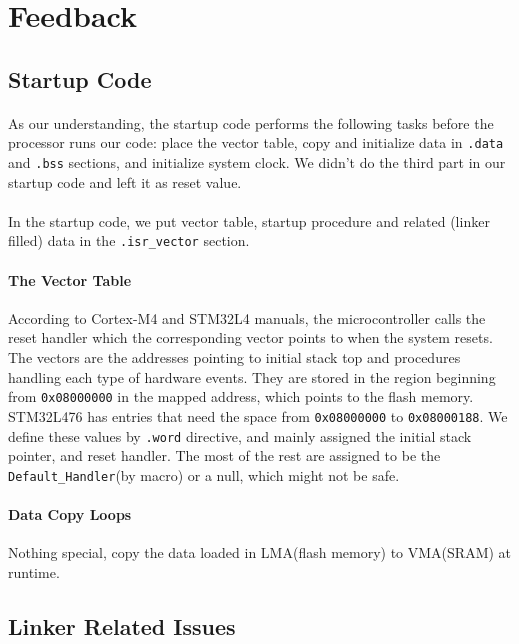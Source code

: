 \section{Feedback}
\subsection{Startup Code}
\paragraph{}
As our understanding, the startup code performs the following tasks before the processor runs our code: 
place the vector table, copy and initialize data in \texttt{.data} and \texttt{.bss} sections, and initialize system clock. 
We didn't do the third part in our startup code and left it as reset value.
\paragraph{}
In the startup code, we put vector table, startup procedure and related (linker filled) data in the \texttt{.isr\_vector} section.
\paragraph{The Vector Table}
According to Cortex-M4 and STM32L4 manuals, the microcontroller calls the reset handler which the corresponding vector points to when the system resets.
The vectors are the addresses pointing to initial stack top and procedures handling each type of hardware events.
They are stored in the region beginning from \texttt{0x08000000} in the mapped address,
which points to the flash memory.
STM32L476 has entries that need the space from \texttt{0x08000000} to \texttt{0x08000188}.
We define these values by \texttt{.word} directive, and mainly assigned the initial stack pointer, and reset handler.
The most of the rest are assigned to be the \texttt{Default\_Handler}(by macro) or a null, which might not be safe.
\paragraph{Data Copy Loops}
Nothing special, copy the data loaded in LMA(flash memory) to VMA(SRAM) at runtime.
\subsection{Linker Related Issues}
